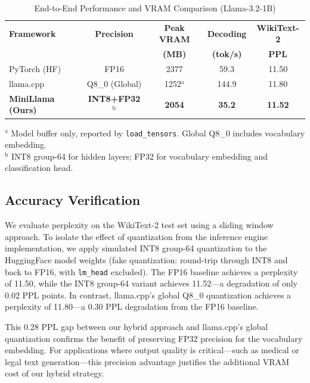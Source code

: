 \documentclass[conference]{IEEEtran}
\begin{document}
\begin{table}[htbp]
\centering
\caption{End-to-End Performance and VRAM Comparison (Llama-3.2-1B)}
\label{tab:end_to_end}
\setlength{\tabcolsep}{3pt}
\begin{tabular}{lcccc}
\toprule
\textbf{Framework} & \textbf{Precision} & \textbf{Peak VRAM} & \textbf{Decoding} & \textbf{WikiText-2} \\
 & & \textbf{(MB)} & \textbf{(tok/s)} & \textbf{PPL} \\
\midrule
PyTorch (HF) & FP16 & 2377 & 59.3 & 11.50 \\
llama.cpp & Q8\_0 (Global) & 1252$^{\mathrm{a}}$ & 144.9 & 11.80 \\
\midrule
\textbf{MiniLlama (Ours)} & \textbf{INT8+FP32$^{\mathrm{b}}$} & \textbf{2054} & \textbf{35.2} & \textbf{11.52} \\
\bottomrule
\end{tabular}

\vspace{3pt}
\raggedright
\scriptsize $^{\mathrm{a}}$ Model buffer only, reported by \texttt{load\_tensors}. Global Q8\_0 includes vocabulary embedding. \\
\scriptsize $^{\mathrm{b}}$ INT8 group-64 for hidden layers; FP32 for vocabulary embedding and classification head.
\end{table}

\subsection{Accuracy Verification}
We evaluate perplexity on the WikiText-2 test set using a sliding window approach. To isolate the effect of quantization from the inference engine implementation, we apply simulated INT8 group-64 quantization to the HuggingFace model weights (fake quantization: round-trip through INT8 and back to FP16, with \texttt{lm\_head} excluded). The FP16 baseline achieves a perplexity of 11.50, while the INT8 group-64 variant achieves 11.52---a degradation of only 0.02 PPL points. In contrast, llama.cpp's global Q8\_0 quantization achieves a perplexity of 11.80---a 0.30 PPL degradation from the FP16 baseline.

This 0.28 PPL gap between our hybrid approach and llama.cpp's global quantization confirms the benefit of preserving FP32 precision for the vocabulary embedding. For applications where output quality is critical---such as medical or legal text generation---this precision advantage justifies the additional VRAM cost of our hybrid strategy.
\end{document}
